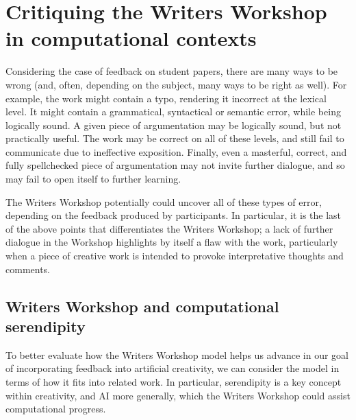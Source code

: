 \section{Critiquing the Writers Workshop in computational contexts}\label{sec:ww-related}

Considering the case of feedback on student papers, there are many ways to be wrong (and, often, depending on the subject, many ways to be right as well).  
For example, the work might contain a typo, rendering it incorrect at the lexical level.  It might contain a grammatical, syntactical or semantic error, while being logically sound.  A given piece of argumentation may be logically sound, but not practically useful.   The work may be correct on all of these levels, and still fail to communicate due to ineffective exposition.  Finally, even a masterful, correct, and fully spellchecked piece of argumentation may not invite further dialogue, and so may fail to open itself to further learning.

The Writers Workshop potentially could uncover all of these types of error, depending on the feedback produced by participants. In particular, it is the last of the above points that differentiates the Writers Workshop; a lack of further dialogue in the Workshop highlights by itself a flaw with the work, particularly when a piece of creative work is intended to provoke interpretative thoughts and comments. 

\subsection{Writers Workshop and computational serendipity}

To better evaluate how the Writers Workshop model helps us advance in our goal of incorporating feedback into artificial creativity, we can consider the model in terms of how it fits into related work. In particular, serendipity is a key concept within creativity, and AI more generally, which the Writers Workshop could assist computational progress. 

